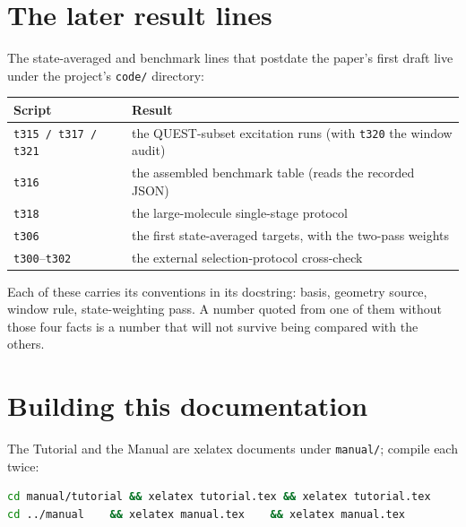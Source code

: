 \section{The later result lines}

The state-averaged and benchmark lines that postdate the paper's
first draft live under the project's \texttt{code/} directory:

\begin{center}
\begin{tabularx}{\textwidth}{>{\raggedright\arraybackslash}p{}X}
\toprule
Script & Result \\
\midrule
\texttt{t315 / t317 / t321} & the QUEST-subset excitation runs (with \texttt{t320} the window audit) \\
\texttt{t316} & the assembled benchmark table (reads the recorded JSON) \\
\texttt{t318} & the large-molecule single-stage protocol \\
\texttt{t306} & the first state-averaged targets, with the two-pass weights \\
\texttt{t300}--\texttt{t302} & the external selection-protocol cross-check \\
\bottomrule
\end{tabularx}
\end{center}

Each of these carries its conventions in its docstring: basis,
geometry source, window rule, state-weighting pass.  A number quoted
from one of them without those four facts is a number that will not
survive being compared with the others.

\section{Building this documentation}

The Tutorial and the Manual are xelatex documents under
\texttt{manual/}; compile each twice:

\begin{lstlisting}[language=bash]
cd manual/tutorial && xelatex tutorial.tex && xelatex tutorial.tex
cd ../manual    && xelatex manual.tex    && xelatex manual.tex
\end{lstlisting}
